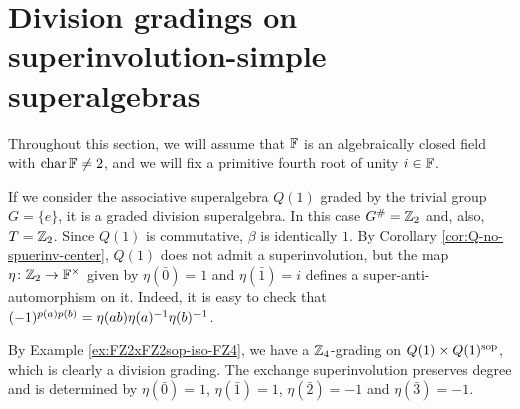 

\section{Division gradings on superinvolution-simple superalgebras}

Throughout this section, we will assume that $\mathbb{F}$ is an algebraically closed field with $\operatorname{char} \mathbb{F} \neq 2$, and we will fix a primitive fourth root of unity $i \in \mathbb{F}$.

\begin{ex}
    If we consider the associative superalgebra $Q(1)$ graded by the trivial group $G = \{e\}$, it is a graded division superalgebra. 
    In this case $G^\# = \mathbb{Z}_2$ and, also, $T = \mathbb{Z}_2$. 
    Since $Q(1)$ is commutative, $\beta$ is identically $1$.
    By Corollary \ref{cor:Q-no-spuerinv-center}, $Q(1)$ does not admit a superinvolution, but the map $\eta\colon \mathbb{Z}_2 \to \mathbb{F}^\times$ given by $\eta (\bar 0) = 1$ and $\eta( \bar 1) = i$ defines a super-anti-automorphism on it. 
    Indeed, it is easy to check that $(-1)^{p(a) p(b)} =  \eta(ab) \eta(a)^{-1} \eta(b)^{-1}$.
\end{ex}

\begin{ex}\label{ex:FZ4-revisited}
    By Example \ref{ex:FZ2xFZ2sop-iso-FZ4}, we have a $\mathbb{Z}_4$-grading on $Q(1)\times Q(1)^{\mathrm{sop}}$, which is clearly a division grading. 
    The exchange superinvolution preserves degree and is determined by $\eta (\bar 0) = 1$, $\eta (\bar 1) = 1$, $\eta (\bar 2) = -1$ and $\eta (\bar 3) = -1$.
\end{ex}


